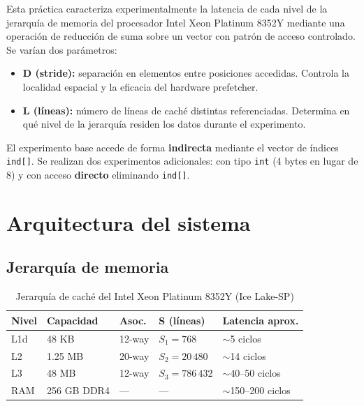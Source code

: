 \documentclass[12pt,a4paper]{article}
\begin{document}
Esta práctica caracteriza experimentalmente la latencia de cada nivel de la jerarquía de memoria del procesador Intel Xeon Platinum 8352Y mediante una operación de reducción de suma sobre un vector con patrón de acceso controlado.
Se varían dos parámetros:

\begin{itemize}[leftmargin=1.5em]
  \item \textbf{D (stride):} separación en elementos entre posiciones accedidas.
  Controla la localidad espacial y la eficacia del hardware prefetcher.
  \item \textbf{L (líneas):} número de líneas de caché distintas referenciadas.
  Determina en qué nivel de la jerarquía residen los datos durante el experimento.
\end{itemize}

El experimento base accede de forma \textbf{indirecta} mediante el vector de índices \texttt{ind[]}.
Se realizan dos experimentos adicionales: con tipo \texttt{int} (4 bytes en lugar de 8) y con acceso \textbf{directo} eliminando \texttt{ind[]}.

\section{Arquitectura del sistema}

\subsection{Jerarquía de memoria}

\begin{table}[H]
\centering
\caption{Jerarquía de caché del Intel Xeon Platinum 8352Y (Ice Lake-SP)}
\label{tab:jerarquia}
\begin{tabular}{lllll}
\toprule
\textbf{Nivel} & \textbf{Capacidad} & \textbf{Asoc.} & \textbf{S (líneas)} & \textbf{Latencia aprox.} \\
\midrule
L1d & 48 KB   & 12-way & $S_1 = 768$       & $\sim$5 ciclos \\
L2  & 1.25 MB & 20-way & $S_2 = 20\,480$   & $\sim$14 ciclos \\
L3  & 48 MB   & 12-way & $S_3 = 786\,432$  & $\sim$40--50 ciclos \\
RAM & 256 GB DDR4 & ---  & ---
      & $\sim$150--200 ciclos \\
\bottomrule
\end{tabular}
\end{table}
\end{document}
